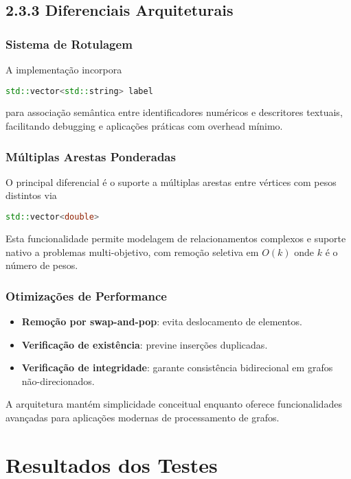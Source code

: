 \documentclass{sbc2023}%
\begin{document}
\subsection{2.3.3 Diferenciais Arquiteturais}

\subsubsection*{Sistema de Rotulagem}
A implementação incorpora
\begin{lstlisting}[language=C++]
std::vector<std::string> label
\end{lstlisting}
para associação semântica entre identificadores numéricos e descritores textuais, facilitando debugging e aplicações práticas com overhead mínimo.

\subsubsection*{Múltiplas Arestas Ponderadas}
O principal diferencial é o suporte a múltiplas arestas entre vértices com pesos distintos via
\begin{lstlisting}[language=C++]
std::vector<double>
\end{lstlisting}
Esta funcionalidade permite modelagem de relacionamentos complexos e suporte nativo a problemas multi-objetivo, com remoção seletiva em \(O(k)\) onde \(k\) é o número de pesos.

\subsubsection*{Otimizações de Performance}
\begin{itemize}
    \item \textbf{Remoção por swap-and-pop}: evita deslocamento de elementos.
    \item \textbf{Verificação de existência}: previne inserções duplicadas.
    \item \textbf{Verificação de integridade}: garante consistência bidirecional em grafos não-direcionados.
\end{itemize}

A arquitetura mantém simplicidade conceitual enquanto oferece funcionalidades avançadas para aplicações modernas de processamento de grafos.


\section{Resultados dos Testes}
\label{sec:results}
\end{document}
